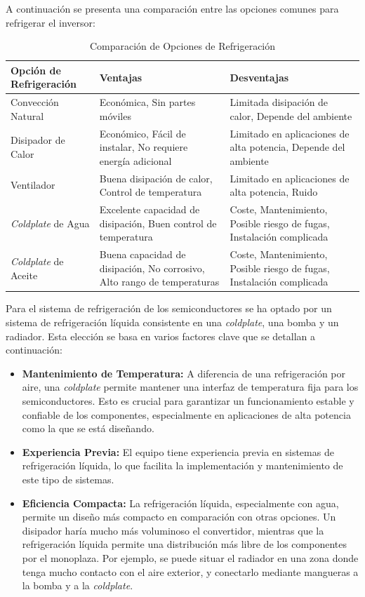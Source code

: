 A continuación se presenta una comparación entre las opciones comunes para refrigerar el inversor:

\begin{table}[H]
	\centering
	\begin{tabular}{|p{2.5cm}|p{5cm}|p{5cm}|}
		\hline
		\textbf{Opción de Refrigeración} & \textbf{Ventajas} & \textbf{Desventajas} \\ \hline
		Convección Natural & Económica, Sin partes móviles & Limitada disipación de calor, Depende del ambiente \\ \hline
		Disipador de Calor & Económico, Fácil de instalar, No requiere energía adicional & Limitado en aplicaciones de alta potencia, Depende del ambiente \\ \hline
		Ventilador & Buena disipación de calor, Control de temperatura & Limitado en aplicaciones de alta potencia, Ruido \\ \hline
		\textit{Coldplate} de Agua & Excelente capacidad de disipación, Buen control de temperatura & Coste, Mantenimiento, Posible riesgo de fugas, Instalación complicada \\ \hline
		\textit{Coldplate} de Aceite & Buena capacidad de disipación, No corrosivo, Alto rango de temperaturas &  Coste, Mantenimiento, Posible riesgo de fugas, Instalación complicada \\ \hline
	\end{tabular}
	\caption{Comparación de Opciones de Refrigeración}
\end{table}



Para el sistema de refrigeración de los semiconductores se ha optado por un sistema de refrigeración líquida consistente en una \textit{coldplate}, una bomba y un radiador. Esta elección se basa en varios factores clave que se detallan a continuación:

\begin{itemize}
	\item \textbf{Mantenimiento de Temperatura:} A diferencia de una refrigeración por aire, una \textit{coldplate} permite mantener una interfaz de temperatura fija para los semiconductores. Esto es crucial para garantizar un funcionamiento estable y confiable de los componentes, especialmente en aplicaciones de alta potencia como la que se está diseñando.
	
	\item \textbf{Experiencia Previa:} El equipo tiene experiencia previa en sistemas de refrigeración líquida, lo que facilita la implementación y mantenimiento de este tipo de sistemas.
	
	\item \textbf{Eficiencia Compacta:} La refrigeración líquida, especialmente con agua, permite un diseño más compacto en comparación con otras opciones. Un disipador haría mucho más voluminoso el convertidor, mientras que la refrigeración líquida permite una distribución más libre de los componentes por el monoplaza. Por ejemplo, se puede situar el radiador en una zona donde tenga mucho contacto con el aire exterior, y conectarlo mediante mangueras a la bomba y a la \textit{coldplate}.
	
	
\end{itemize}

